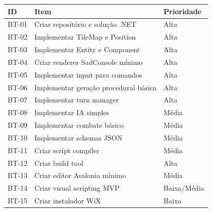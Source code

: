 \documentclass[12pt,a4paper]{article}
\begin{document}
\begin{longtable}{p{2.2cm}p{7.2cm}p{4.6cm}}
\toprule
\textbf{ID} & \textbf{Item} & \textbf{Prioridade} \\
\midrule
BT-01 & Criar repositório e solução .NET & Alta \\
BT-02 & Implementar TileMap e Position & Alta \\
BT-03 & Implementar Entity e Component & Alta \\
BT-04 & Criar renderer SadConsole mínimo & Alta \\
BT-05 & Implementar input para comandos & Alta \\
BT-06 & Implementar geração procedural básica & Alta \\
BT-07 & Implementar turn manager & Alta \\
BT-08 & Implementar IA simples & Média \\
BT-09 & Implementar combate básico & Média \\
BT-10 & Implementar schemas JSON & Média \\
BT-11 & Criar script compiler & Média \\
BT-12 & Criar build tool & Alta \\
BT-13 & Criar editor Avalonia mínimo & Média \\
BT-14 & Criar visual scripting MVP & Baixa/Média \\
BT-15 & Criar instalador WiX & Baixa \\
\bottomrule
\end{longtable}
\end{document}
